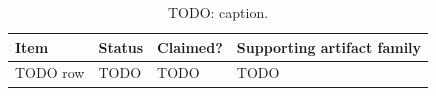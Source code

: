 \begin{table}[tbp]
  \centering
  \caption{TODO: caption.}
  \label{tab:template-05}
  \small
  \begin{tabularx}{\textwidth}{@{}>{\raggedright\arraybackslash}X>{\raggedright\arraybackslash}X>{\raggedright\arraybackslash}p{}>{\raggedright\arraybackslash}p{}@{}}
    \toprule
    Item & Status & Claimed? & Supporting artifact family \\
    \midrule
    TODO row
      & TODO
      & TODO
      & TODO \\
    \bottomrule
  \end{tabularx}
\end{table}
